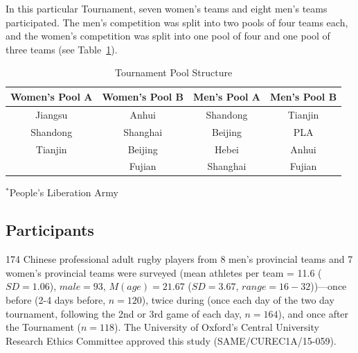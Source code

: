 In this particular Tournament, seven women's teams and eight men's teams participated.  The men’s competition was split into two pools of four teams each, and the women’s competition was split into one pool of four and one pool of three teams (see Table~\ref{tab:poolStructure}). \\


  \begin{table}[htpb]\caption{Tournament Pool Structure}
    \begin{center}
      \begin{small}
          \begin{tabular}{| c | c || c | c |}
            \hline
            \bf Women's Pool A & \bf Women's Pool B &  \bf Men's Pool A & \bf  Men's Pool B \\
            \hline
            Jiangsu & Anhui & Shandong & Tianjin \\
            Shandong & Shanghai & Beijing & PLA\superscript{*} \\
            Tianjin & Beijing & Hebei & Anhui \\
               & Fujian & Shanghai & Fujian \\
               \hline
          \end{tabular}
            \end{small}
          \end{center}

          \begin{footnotesize}
            $^*$People's Liberation Army
          \end{footnotesize}

    \label{tab:poolStructure}
      \end{table}







\subsection{Participants}
174 Chinese professional adult rugby players from 8 men’s provincial teams and 7 women’s provincial teams were surveyed  (mean athletes per team = 11.6 ($SD =1.06$), $male = 93$, $M(age) = 21.67$ ($SD = 3.67$, $range = 16 - 32$))---once before (2-4 days before, $n = 120$), twice during (once each day of the two day tournament, following the 2nd or 3rd game of each day, $n = 164$), and once after the Tournament ($n = 118$).  The University of Oxford’s Central University Research Ethics Committee approved this study (SAME/CUREC1A/15-059).

